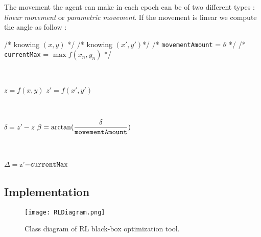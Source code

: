 The movement the agent can make in each epoch can be of two different types : \textit{linear movement} or \textit{parametric movement}. If the movement is linear we compute the angle as follow :

\begin{algorithm}
	/* knowing $(x, y)$ */ \;
	/* knowing $(x', y')$*/ \;
	/* {\tt movementAmount} = $\theta$ */ \;
	/* {\tt currentMax} = $\max f(x_n, y_n)$ */ \;
	
	
	\
	
	$z = f(x, y)$ \;
	$z' = f(x', y')$\;
	
	\
	
	$\delta = z' - z$ \;
	$\beta = \arctan(\dfrac{\delta}{\tt movementAmount})$
	 
	 \
	 
	 $\Delta = $z'$ - {\tt currentMax} $
	
	
	
\end{algorithm}

\subsection{Implementation}

\begin{figure} [h!]
	\texttt{[image: RLDiagram.png]}
	\caption{Class diagram of RL black-box optimization tool.}
	\label{fig:BoProcess}
\end{figure}